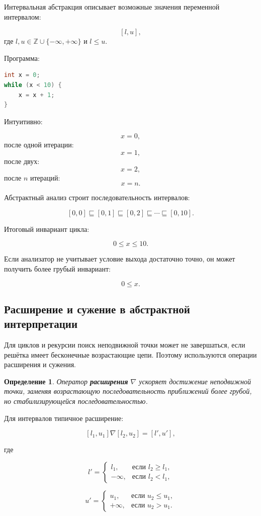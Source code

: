 \documentclass[12pt,a4paper]{article}
\newtheorem{definition}{Определение}
\begin{document}
Интервальная абстракция описывает возможные значения переменной интервалом:

\[
[l,u],
\]
где $l,u \in \mathbb{Z}\cup\{-\infty,+\infty\}$ и $l \le u$.

Программа:

\begin{lstlisting}[language=C]
int x = 0;
while (x < 10) {
    x = x + 1;
}
\end{lstlisting}

Интуитивно:

\[
x = 0,
\]
после одной итерации:
\[
x = 1,
\]
после двух:
\[
x = 2,
\]
после $n$ итераций:
\[
x = n.
\]

Абстрактный анализ строит последовательность интервалов:

\[
[0,0] \sqsubseteq [0,1] \sqsubseteq [0,2] \sqsubseteq \cdots \sqsubseteq [0,10].
\]

Итоговый инвариант цикла:

\[
0 \le x \le 10.
\]

Если анализатор не учитывает условие выхода достаточно точно, он может получить более грубый инвариант:

\[
0 \le x.
\]

\subsection{Расширение и сужение в абстрактной интерпретации}

Для циклов и рекурсии поиск неподвижной точки может не завершаться, если решётка имеет бесконечные возрастающие цепи. Поэтому используются операции расширения и сужения.

\begin{definition}
Оператор \textbf{расширения} $\nabla$ ускоряет достижение неподвижной точки, заменяя возрастающую последовательность приближений более грубой, но стабилизирующейся последовательностью.
\end{definition}

Для интервалов типичное расширение:

\[
[l_1,u_1] \nabla [l_2,u_2]
=
[l',u'],
\]

где

\[
l' =
\begin{cases}
l_1, & \text{если } l_2 \ge l_1,\\
-\infty, & \text{если } l_2 < l_1,
\end{cases}
\]

\[
u' =
\begin{cases}
u_1, & \text{если } u_2 \le u_1,\\
+\infty, & \text{если } u_2 > u_1.
\end{cases}
\]
\end{document}
